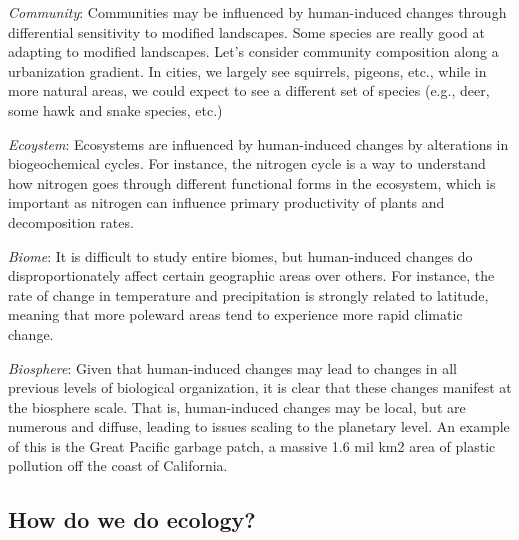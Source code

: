 \documentclass[12pt]{article}
\begin{document}
\bigskip

\textit{Community}:
Communities may be influenced by human-induced changes through differential sensitivity to modified landscapes. Some species are really good at adapting to modified landscapes. Let's consider community composition along a urbanization gradient. In cities, we largely see squirrels, pigeons, etc., while in more natural areas, we could expect to see a different set of species (e.g., deer, some hawk and snake species, etc.)

\bigskip

\textit{Ecoystem}:
Ecosystems are influenced by human-induced changes by alterations in biogeochemical cycles. For instance, the nitrogen cycle is a way to understand how nitrogen goes through different functional forms in the ecosystem, which is important as nitrogen can influence primary productivity of plants and decomposition rates. 

\bigskip


\textit{Biome}: 
It is difficult to study entire biomes, but human-induced changes do disproportionately affect certain geographic areas over others. For instance, the rate of change in temperature and precipitation is strongly related to latitude, meaning that more poleward areas tend to experience more rapid climatic change. 


\bigskip


\textit{Biosphere}:
Given that human-induced changes may lead to changes in all previous levels of biological organization, it is clear that these changes manifest at the biosphere scale. That is, human-induced changes may be local, but are numerous and diffuse, leading to issues scaling to the planetary level. An example of this is the Great Pacific garbage patch, a massive 1.6 mil km2 area of plastic pollution off the coast of California. 


















\subsection*{How do we do ecology?}
\end{document}
